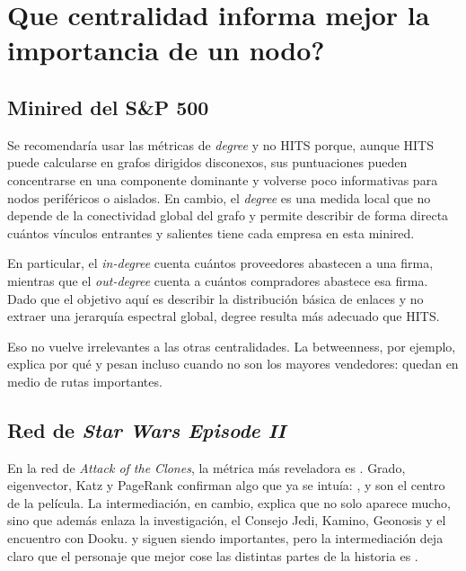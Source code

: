 \newpage
\section{Que centralidad informa mejor la importancia de un nodo?}

\subsection{Minired del S\&P 500}


Se recomendar\'ia usar las m\'etricas de \textit{degree} y no HITS porque, aunque HITS puede calcularse en grafos dirigidos disconexos, sus puntuaciones pueden concentrarse en una componente dominante y volverse poco informativas para nodos periféricos o aislados. En cambio, el \textit{degree} es una medida local que no depende de la conectividad global del grafo y permite describir de forma directa cuántos vínculos entrantes y salientes tiene cada empresa en esta minired.

En particular, el \textit{in-degree} cuenta cuántos proveedores abastecen a una firma, mientras que el \textit{out-degree} cuenta a cuántos compradores abastece esa firma. Dado que el objetivo aquí es describir la distribución básica de enlaces y no extraer una jerarquía espectral global, degree resulta más adecuado que HITS.

Eso no vuelve irrelevantes a las otras centralidades. La betweenness, por ejemplo, explica por qu\'e  y  pesan incluso cuando no son los mayores vendedores: quedan en medio de rutas importantes. 

\subsection{Red de \textit{Star Wars Episode II}}

En la red de \textit{Attack of the Clones}, la m\'etrica m\'as reveladora es . Grado, eigenvector, Katz y PageRank confirman algo que ya se intu\'ia: ,  y  son el centro de la pel\'icula. La intermediaci\'on, en cambio, explica que  no solo aparece mucho, sino que adem\'as enlaza la investigaci\'on, el Consejo Jedi, Kamino, Geonosis y el encuentro con Dooku.  y  siguen siendo importantes, pero la intermediaci\'on deja claro que el personaje que mejor cose las distintas partes de la historia es .